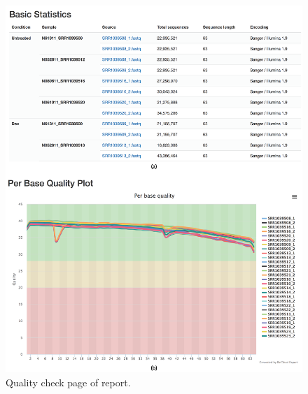 \begin{figure}[!tb]
\centering
\includegraphics[width=1\textwidth]{images/report_qc}
\caption[Quality check page of report]{
    Quality check page of report.
}
\label{fig:report-qc}
\end{figure}
